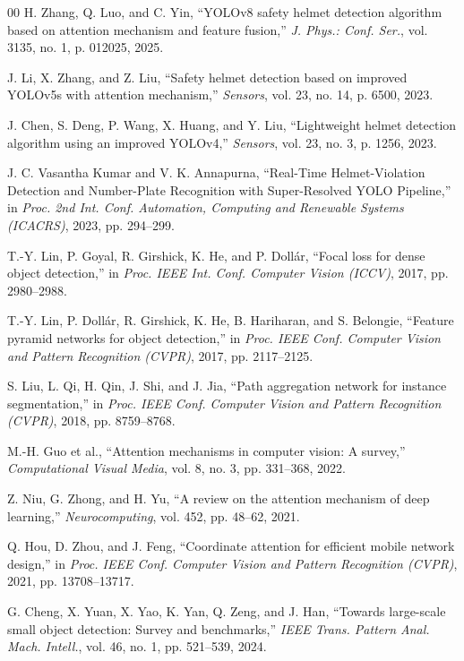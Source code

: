 \documentclass[conference]{IEEEtran}
\begin{document}
\begin{thebibliography}{00}
 H. Zhang, Q. Luo, and C. Yin, ``YOLOv8 safety helmet detection algorithm based on attention mechanism and feature fusion,'' \textit{J. Phys.: Conf. Ser.}, vol. 3135, no. 1, p. 012025, 2025.

 J. Li, X. Zhang, and Z. Liu, ``Safety helmet detection based on improved YOLOv5s with attention mechanism,'' \textit{Sensors}, vol. 23, no. 14, p. 6500, 2023.

 J. Chen, S. Deng, P. Wang, X. Huang, and Y. Liu, ``Lightweight helmet detection algorithm using an improved YOLOv4,'' \textit{Sensors}, vol. 23, no. 3, p. 1256, 2023.

 J. C. Vasantha Kumar and V. K. Annapurna, ``Real-Time Helmet-Violation Detection and Number-Plate Recognition with Super-Resolved YOLO Pipeline,'' in \textit{Proc. 2nd Int. Conf. Automation, Computing and Renewable Systems (ICACRS)}, 2023, pp. 294--299.

 T.-Y. Lin, P. Goyal, R. Girshick, K. He, and P. Doll{\'a}r, ``Focal loss for dense object detection,'' in \textit{Proc. IEEE Int. Conf. Computer Vision (ICCV)}, 2017, pp. 2980--2988.

 T.-Y. Lin, P. Doll{\'a}r, R. Girshick, K. He, B. Hariharan, and S. Belongie, ``Feature pyramid networks for object detection,'' in \textit{Proc. IEEE Conf. Computer Vision and Pattern Recognition (CVPR)}, 2017, pp. 2117--2125.

 S. Liu, L. Qi, H. Qin, J. Shi, and J. Jia, ``Path aggregation network for instance segmentation,'' in \textit{Proc. IEEE Conf. Computer Vision and Pattern Recognition (CVPR)}, 2018, pp. 8759--8768.

 M.-H. Guo et al., ``Attention mechanisms in computer vision: A survey,'' \textit{Computational Visual Media}, vol. 8, no. 3, pp. 331--368, 2022.

 Z. Niu, G. Zhong, and H. Yu, ``A review on the attention mechanism of deep learning,'' \textit{Neurocomputing}, vol. 452, pp. 48--62, 2021.

 Q. Hou, D. Zhou, and J. Feng, ``Coordinate attention for efficient mobile network design,'' in \textit{Proc. IEEE Conf. Computer Vision and Pattern Recognition (CVPR)}, 2021, pp. 13708--13717.

 G. Cheng, X. Yuan, X. Yao, K. Yan, Q. Zeng, and J. Han, ``Towards large-scale small object detection: Survey and benchmarks,'' \textit{IEEE Trans. Pattern Anal. Mach. Intell.}, vol. 46, no. 1, pp. 521--539, 2024.


\end{thebibliography}
\end{document}
